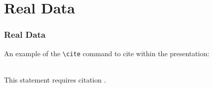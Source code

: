 \section{Real Data}

\begin{frame}[fragile] %
    \frametitle{Real Data}
    An example of the \verb|\cite| command to cite within the presentation:\\~
    
    This statement requires citation \cite{p1}.
\end{frame}
    

